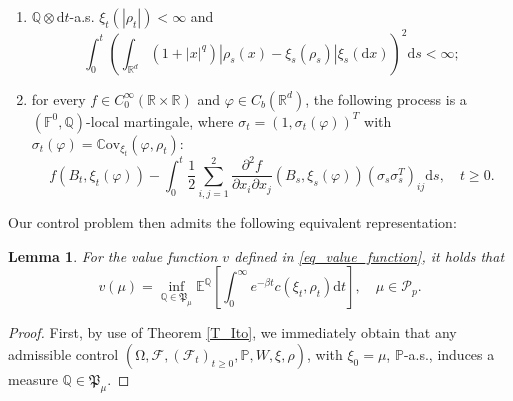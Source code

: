 \documentclass{article}
\newtheorem{lemma}[theorem]{Lemma}
\theoremstyle{definition}
\numberwithin{equation}{section}
\numberwithin{theorem}{section}
\newcommand{\E}{\mathbb{E}}
\renewcommand{\P}{\mathbb{P}}
\newcommand{\Pp}{\mathbb{Q}}
\newcommand{\R}{\mathbb{R}}
\newcommand{\dx}{\mathrm{d}x}
\newcommand{\ds}{\mathrm{d}s}
\newcommand{\dt}{\mathrm{d}t}
\newcommand{\Fb}{\mathbb{F}}
\newcommand{\Fc}{\mathcal{F}}
\newcommand{\Mb}{\mathbb{M}}
\newcommand{\Pc}{\mathcal{P}}
\newcommand{\Cov}{\mathbb{C}\mathrm{ov}}
\newcommand{\Pk}{\mathfrak{P}}
\renewcommand{\P}{{\mathbb P}}
\begin{document}
\begin{appendix}
\begin{enumerate}
		\item\label{it3ii} $\Pp\otimes\dt$-a.s. $\xi_t(|\rho_t|)<\infty$ and
		\begin{equation}\label{eq:DPP_worthy}
			\int_0^t\left(\int_{\R^d} (1 + |x|^q) \left|\rho_s(x)-\xi_s(\rho_s)\right| \xi_s(\dx)\right)^2\ds<\infty;
		\end{equation}
		\item\label{it3iii} for every $f\in C^\infty_0(\R\times\R)$ and $\varphi\in C_b({\R^d})$, the following process is a $(\Fb^0,\Pp)$-local martingale, where $\sigma_t=(1,\sigma_t(\varphi))^T$ with $\sigma_t(\varphi)=\Cov_{\xi_t}(\varphi,\rho_t)$:
	\begin{equation}\label{eq:mp_simplified}
		f\left(B_t,\xi_t(\varphi)\right)-\int_0^t\frac{1}{2}\sum_{i,j=1}^2\frac{\partial^2f}{\partial x_i\partial x_j}\left(B_s,\xi_s(\varphi)\right)\left(\sigma_s\sigma_s^T\right)_{ij}\ds,
		\quad t\ge 0.
	\end{equation}	
	\end{enumerate}
	
	
	Our control problem then admits the following equivalent representation: 

	\begin{lemma}\label{lem:dpp_equiv_problems}
For the value function $v$ defined in \eqref{eq_value_function}, it holds that
	\begin{equation}\label{eq:vdefn}
		v(\mu)
		=\inf_{\Pp\in\Pk_\mu}\E^\Pp\left[\int_0^\infty e^{-\beta t}c(\xi_t,\rho_t)\dt\right],
		\quad \mu\in \Pc_p.
	\end{equation}
	\end{lemma}
	
	
	\begin{proof}
		First, by use of Theorem \ref{T_Ito}, we immediately obtain that any admissible control $(\mathrm{\Omega},\Fc,(\Fc_t)_{t\ge 0},\P,W,\xi,\rho)$, with $\xi_0=\mu$, $\P$-a.s., induces a measure $\Pp\in\Pk_\mu$.
		

\end{proof}
\end{appendix}
\end{document}
